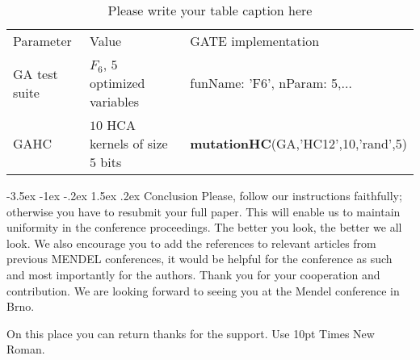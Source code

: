 \documentclass[a4paper,10pt]{article}
\makeatletter
\theoremstyle{definition}
\renewcommand\section{\@startsection {section}{1}{\z@}%
                                   {-3.5ex \@plus -1ex \@minus -.2ex}%
                                   {1.5ex \@plus.2ex}%
                                   {\large\bfseries}}
\makeatother
\begin{document}
%
%
\begin{table}[h] 
\begin{center}
\caption{Please write your table caption here} 
\label{tab:1}
\begin{tabular}{lll}
\hline\noalign{\smallskip}
Parameter & Value& GATE implementation\\
\noalign{\smallskip}
\hline\noalign{\smallskip}
GA test suite & $F_{6}$, $5$ optimized
variables & funName: 'F6', nParam: 5,$\ldots$ \\
GAHC& $10$ HCA kernels of size $5$ bits& \textbf{mutationHC}(GA,'HC12',10,'rand',5)\\
\hline
\end{tabular}
\end{center}
\end{table}

\section{Conclusion}
Please, follow our instructions faithfully; otherwise you have to
resubmit your full paper. This will enable us to maintain
uniformity in the conference proceedings. The better you look, the
better we all look. We also encourage you to add the references to relevant articles from previous MENDEL conferences, it would be helpful for the conference as such and most importantly for the authors.
Thank you for your cooperation and
contribution. We are looking forward to seeing you at the Mendel
conference in Brno.

\vspace*{10pt}  On this place you
can return thanks for the support. Use 10pt Times New Roman.

%
\begingroup
\makeatletter
\renewcommand\section{\@startsection {section}{1}{\z@}%
                                   {-3.5ex \@plus -1ex \@minus -.2ex}%
                                   {4.5ex \@plus.2ex}%
                                   {\large\bfseries}}
\makeatother
\end{document}
